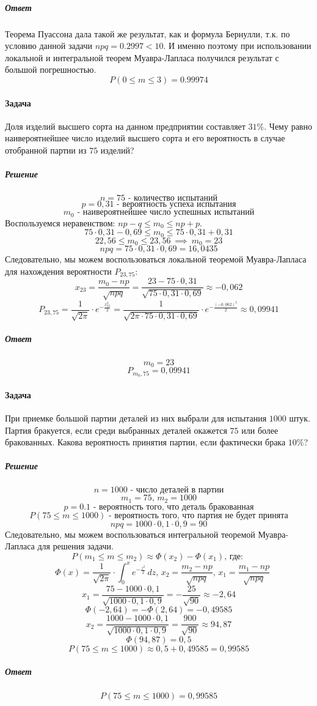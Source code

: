 \documentclass[fleqn, 10pt]{article}
\begin{document}
\subparagraph{Ответ}
Теорема Пуассона дала такой же результат, как и формула Бернулли, т.к. по условию данной задачи \(npq = 0.2997 < 10\). И именно поэтому при использовании локальной и интегральной теорем Муавра-Лапласа получился результат с большой погрешностью.
\[P(0 \leq m \leq 3) = 0.99974\]

\newpage

\paragraph{Задача}
Доля изделий высшего сорта на данном предприятии составляет \(31\%\). Чему равно наивероятнейшее число изделий высшего сорта и его вероятность в случае отобранной партии из \(75\) изделий?
\subparagraph{Решение}
\[n = 75 \text{ - количество испытаний}\]
\[p = 0,31 \text{ - вероятность успеха испытания}\]
\[m_0 \text{ - наивероятнейшее число успешных испытаний}\]
Воспользуемся неравенством: \(np - q \leq m_0 \leq np+p\).
\[75\cdot0,31-0,69\leq m_0 \leq 75\cdot0,31+0,31\]
\[22,56 \leq m_0 \leq 23,56 \  \implies \ m_0 = 23\]
\[npq = 75\cdot0,31\cdot0,69 = 16,0435\]
Следовательно, мы можем воспользоваться локальной теоремой Муавра-Лапласа для нахождения вероятности \(P_{23,75}\):
\[x_{23} = \frac{m_0-np}{\sqrt{npq}} = \frac{23-75\cdot0,31}{\sqrt{75\cdot0,31\cdot0,69}} \approx -0,062\]
\[P_{23,75} = \frac{1}{\sqrt{2\pi}}\cdot e^{-\frac{x_{23}^2}{2}} = \frac{1}{\sqrt{2\pi\cdot75\cdot0,31\cdot0,69}}\cdot e^{-\frac{(-0,062)^2}{2}} \approx 0,09941\]

\subparagraph{Ответ}
\[m_0 = 23\]
\[P_{m_0,75} = 0,09941\]

\newpage

\paragraph{Задача}
При приемке большой партии деталей из них выбрали для испытания \(1000\) штук. Партия бракуется, если среди выбранных деталей окажется \(75\) или более бракованных. Какова вероятность принятия партии, если фактически брака \(10\%\)?
\subparagraph{Решение}
\[n = 1000 \text{ - число деталей в партии}\]
\[m_1 = 75\text{, }m_2 = 1000\]
\[p = 0.1 \text{ - вероятность того, что деталь бракованная}\]
\[P(75 \leq m \leq 1000) \text{ - вероятность того, что партия не будет принята}\]
\[npq = 1000\cdot0,1\cdot0,9 = 90\]
Следовательно, мы можем воспользоваться интегральной теоремой Муавра-Лапласа для решения задачи.
 \[P(m_1 \leq m \leq m_2) \approx \Phi(x_2) - \Phi(x_1)\text{, где: } \]
  \[\ \ \ \ \Phi(x) = \frac{1}{\sqrt{2\pi}}\cdot\int_0^xe^{-\frac{z^2}{2}}\,dz\text{, } x_2=\frac{m_2-np}{\sqrt{npq}}\text{, } x_1=\frac{m_1-np}{\sqrt{npq}}\]
  \[x_1 = \frac{75 - 1000\cdot0,1}{\sqrt{1000\cdot0,1\cdot0,9}} = -\frac{25}{\sqrt{90}} \approx -2,64\]
  \[\Phi(-2,64) = -\Phi(2,64) = -0,49585\]
  \[x_2 = \frac{1000 - 1000\cdot0,1}{\sqrt{1000\cdot0,1\cdot0,9}} = \frac{900}{\sqrt{90}} \approx 94,87\]
  \[\Phi(94,87) = 0,5\]
  \[P(75 \leq m \leq 1000) \approx 0,5 + 0,49585 = 0,99585\]
\subparagraph{Ответ}
\[P(75 \leq m \leq 1000) = 0,99585\]
\end{document}
